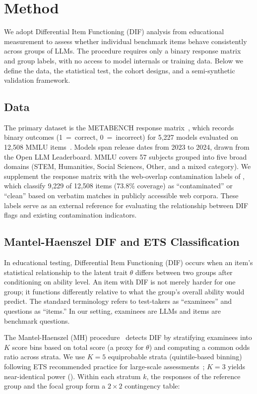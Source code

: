 \section{Method}
\label{sec:method}

We adopt Differential Item Functioning (DIF) analysis from educational measurement to assess whether individual benchmark items behave consistently across groups of LLMs. The procedure requires only a binary response matrix and group labels, with no access to model internals or training data. Below we define the data, the statistical test, the cohort designs, and a semi-synthetic validation framework.

\subsection{Data}
\label{sec:data}

The primary dataset is the METABENCH response matrix~\citep{kipnis2024metabench}, which records binary outcomes (1~=~correct, 0~=~incorrect) for 5,227 models evaluated on 12,508 MMLU items~\citep{hendrycks2021mmlu}. Models span release dates from 2023 to 2024, drawn from the Open LLM Leaderboard. MMLU covers 57 subjects grouped into five broad domains (STEM, Humanities, Social Sciences, Other, and a mixed category). We supplement the response matrix with the web-overlap contamination labels of \citet{li2024contamination}, which classify 9,229 of 12,508 items (73.8\% coverage) as ``contaminated'' or ``clean'' based on verbatim matches in publicly accessible web corpora. These labels serve as an external reference for evaluating the relationship between DIF flags and existing contamination indicators.

\subsection{Mantel-Haenszel DIF and ETS Classification}
\label{sec:mhdif}

In educational testing, Differential Item Functioning (DIF) occurs when an item's statistical relationship to the latent trait $\theta$ differs between two groups after conditioning on ability level. An item with DIF is not merely harder for one group; it functions differently relative to what the group's overall ability would predict. The standard terminology refers to test-takers as ``examinees'' and questions as ``items.'' In our setting, examinees are LLMs and items are benchmark questions.

The Mantel-Haenszel (MH) procedure~\citep{holland1988mh,magis2010difr} detects DIF by stratifying examinees into $K$ score bins based on total score (a proxy for $\theta$) and computing a common odds ratio across strata. We use $K = 5$ equiprobable strata (quintile-based binning) following ETS recommended practice for large-scale assessments~\citep{donoghue1993mh,clauser1998dif}; $K{=}3$ yields near-identical power (). Within each stratum $k$, the responses of the reference group and the focal group form a $2 \times 2$ contingency table:

